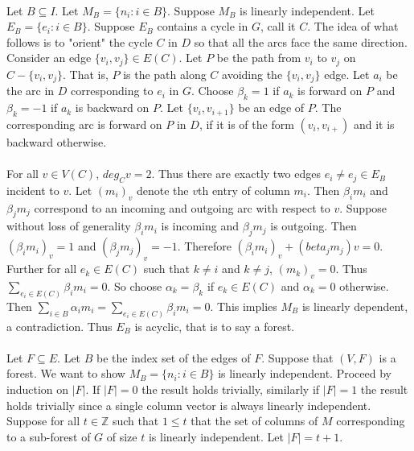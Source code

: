 \documentclass[letterpaper,12pt,oneside,onecolumn]{report}
\begin{document}
\paragraph{}
Let $B \subseteq I$. Let $M_B = \{n_i : i \in B\}$. Suppose $M_B$ is linearly independent. Let $E_B = \{e_i : i \in B\}$. Suppose $E_B$ contains a cycle in $G$, call it $C$. The idea of what follows is to "orient" the cycle $C$ in $D$ so that all the arcs face the same direction. Consider an edge $\{v_i, v_j \} \in E(C)$. Let $P$ be the path from $v_i$ to $v_j$ on $C - \{v_i,v_j\}$. That is, $P$ is the path along $C$ avoiding the $\{v_i, v_j\}$ edge. Let $a_i$ be the arc in $D$ corresponding to $e_i$ in $G$. Choose $\beta_k = 1$ if $a_k$ is forward on $P$ and $\beta_k = -1$ if $a_k$ is backward on $P$. Let $\{v_i, v_{i+1}\}$ be an edge of $P$. The corresponding arc is forward on $P$ in $D$, if it is of the form $(v_i, v_{i+})$ and it is backward otherwise.
\paragraph{}
For all $v \in V(C)$, $deg_Cv = 2$. Thus there are exactly two edges $e_i \neq e_j \in E_B$ incident to $v$. Let $(m_i)_v$ denote the $v$th entry of column $m_i$. Then $\beta_i m_i$ and $\beta_j m_j$ correspond to an incoming and outgoing arc with respect to $v$. Suppose without loss of generality $\beta_i m_i$ is incoming and $\beta_j m_j$ is outgoing. Then $(\beta_i m_i)_v = 1$ and $(\beta_j m_j)_v = -1$. Therefore $(\beta_i m_i)_v + (beta_j m_j)v = 0$. Further for all $e_k \in E(C)$ such that $k \neq i$ and $k \neq j$, $(m_k)_v = 0$. Thus $\sum_{e_i \in E(C)} \beta_i m_i = 0$. So choose $\alpha_k = \beta_k$ if $e_k \in E(C)$ and $\alpha_k = 0$ otherwise. Then $\sum_{i\in B} \alpha_i m_i = \sum_{e_i \in E(C)} \beta_i m_i = 0$. This implies $M_B$ is linearly dependent, a contradiction. Thus $E_B$ is acyclic, that is to say a forest.
\paragraph{}
Let $F \subseteq E$. Let $B$ be the index set of the edges of $F$. Suppose that $(V,F)$ is a forest. We want to show $M_B = \{n_i : i \in B\}$ is linearly independent. Proceed by induction on $|F|$. If $|F| = 0$ the result holds trivially, similarly if $|F| = 1$ the result holds trivially since a single column vector is always linearly independent. Suppose for all $t \in \mathbb{Z}$ such that $1 \leq t$ that the set of columns of $M$ corresponding to a sub-forest of $G$ of size $t$ is linearly independent. Let $|F| = t+1$. 
\end{document}

